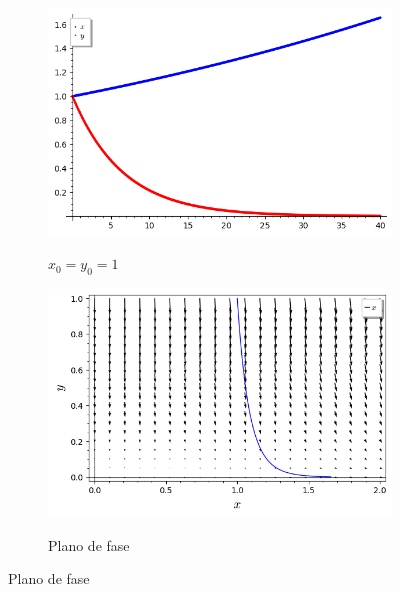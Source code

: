 \begin{figure}[H]
    \centering
    \begin{subfigure}{0.4\textwidth}
        \includegraphics[scale=0.48]{figuras/LV_1.png}
        \label{fig:LV_1}
        \caption{$x_0 = y_0 = 1$}
    \end{subfigure}
    \begin{subfigure}{0.4\textwidth}
        \includegraphics[scale=0.48]{figuras/LV_4.png}
        \label{fig:LV_4}
        \caption{Plano de fase}
    \end{subfigure}
\end{figure}

